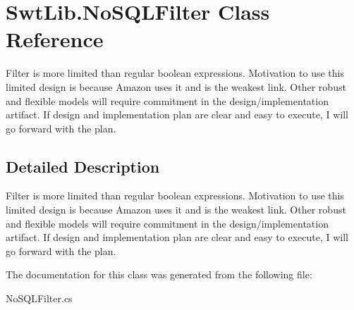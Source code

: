 \hypertarget{class_swt_lib_1_1_no_s_q_l_filter}{\section{Swt\-Lib.\-No\-S\-Q\-L\-Filter Class Reference}
\label{class_swt_lib_1_1_no_s_q_l_filter}
}


Filter is more limited than regular boolean expressions. Motivation to use this limited design is because Amazon uses it and is the weakest link. Other robust and flexible models will require commitment in the design/implementation artifact. If design and implementation plan are clear and easy to execute, I will go forward with the plan.  




\subsection{Detailed Description}
Filter is more limited than regular boolean expressions. Motivation to use this limited design is because Amazon uses it and is the weakest link. Other robust and flexible models will require commitment in the design/implementation artifact. If design and implementation plan are clear and easy to execute, I will go forward with the plan. 



The documentation for this class was generated from the following file\-:\begin{DoxyCompactItemize}
\item 
No\-S\-Q\-L\-Filter.\-cs\end{DoxyCompactItemize}
